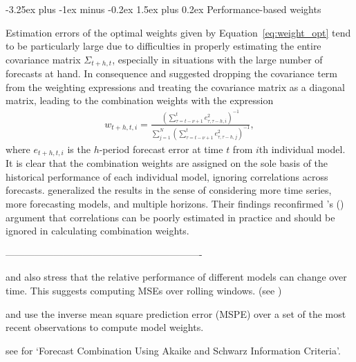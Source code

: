 \documentclass[11pt]{article}
\makeatletter
\def\citeapos#1{\citeauthor{#1}'s (\citeyear{#1})}
\renewcommand{\paragraph}{\@startsection{paragraph}{4}{0ex}%
   {-3.25ex plus -1ex minus -0.2ex}%
   {1.5ex plus 0.2ex}%
   {\normalfont\normalsize\bfseries}}
\makeatother
\begin{document}
\paragraph{Performance-based weights}

Estimation errors of the optimal weights given by Equation~\eqref{eq:weight_opt} tend to be particularly large due to difficulties in properly estimating the entire covariance matrix $\Sigma_{t+h, t}$, especially in situations with the large number of forecasts at hand. In consequence \cite{Bates1969-yj} and \cite{Newbold1974-lp} suggested dropping the covariance term from the weighting expressions and treating the covariance matrix as a diagonal matrix, leading to the combination weights with the expression
\begin{align}
w_{t+h, t, i}=\frac{\left( \sum_{\tau=t-\nu+1}^{t} e_{\tau, \tau-h, i}^{2} \right)^{-1}}{\sum_{j=1}^{N}\left(\sum_{\tau=t-\nu+1}^{t} e_{\tau, \tau-h, j}^{2}\right)^{-1}},
\end{align}
where $e_{t+h, t, i}$ is the $h$-period forecast error at time $t$ from $i$th individual model. It is clear that the combination weights are assigned on the sole basis of the historical performance of each individual model, ignoring correlations across forecasts. \cite{Winkler1983-ra} generalized the results in the sense of considering more time series, more forecasting models, and multiple horizons. Their findings reconfirmed \citeapos{Newbold1974-lp} argument that correlations can be poorly estimated in practice and should be ignored in calculating combination weights.

{\color{blue}-------------------------------------------------------------}



\cite{Bates1969-yj} and \cite{Newbold1974-lp} also stress that the relative performance of different models can change over time. This suggests computing MSEs over rolling windows. (see \cite{Stock1998-np})

\cite{Stock2004-rq} and \cite{Timmermann2006-en} use the inverse mean square prediction error (MSPE) over a set of the most recent observations to compute model weights.


see \cite{Swanson2001-eg} for `Forecast Combination Using Akaike and Schwarz Information Criteria'.
\end{document}
